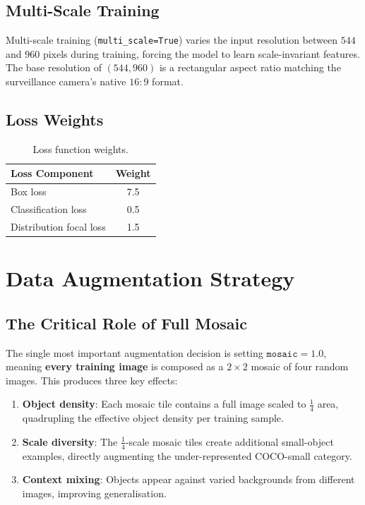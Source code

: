 \documentclass[12pt, titlepage]{article}
\begin{document}
\subsection{Multi-Scale Training}
\label{sec:multiscale}

Multi-scale training (\texttt{multi\_scale=True}) varies the input resolution
between $544$ and $960$ pixels during training, forcing the model to learn
scale-invariant features. The base resolution of $(544, 960)$ is a rectangular
aspect ratio matching the surveillance camera's native $16{:}9$ format.

\subsection{Loss Weights}

\begin{table}[h]
  \centering
  \caption{Loss function weights.}
  \label{tab:loss}
  \begin{tabular}{@{}lc@{}}
    \toprule
    \textbf{Loss Component} & \textbf{Weight} \\
    \midrule
    Box loss                & 7.5             \\
    Classification loss     & 0.5             \\
    Distribution focal loss & 1.5             \\
    \bottomrule
  \end{tabular}
\end{table}

\section{Data Augmentation Strategy}
\label{sec:augmentation}

\subsection{The Critical Role of Full Mosaic}
\label{sec:mosaic}

The single most important augmentation decision is setting $\texttt{mosaic} =
  1.0$, meaning \textbf{every training image} is composed as a $2{\times}2$
mosaic of four random images. This produces three key effects:

\begin{enumerate}[leftmargin=*]
  \item \textbf{Object density}: Each mosaic tile contains a full image
        scaled to $\frac{1}{4}$ area, quadrupling the effective object
        density per training sample.
  \item \textbf{Scale diversity}: The $\frac{1}{4}$-scale mosaic tiles
        create additional small-object examples, directly augmenting the
        under-represented COCO-small category.
  \item \textbf{Context mixing}: Objects appear against varied backgrounds
        from different images, improving generalisation.
\end{enumerate}
\end{document}
